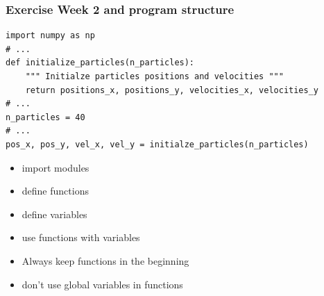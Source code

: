 \begin{frame}[fragile]

    \frametitle{Exercise Week 2 and program structure}

\begin{lstlisting}
import numpy as np
# ...
def initialize_particles(n_particles):
    """ Initialze particles positions and velocities """
    return positions_x, positions_y, velocities_x, velocities_y
# ...
n_particles = 40
# ...
pos_x, pos_y, vel_x, vel_y = initialze_particles(n_particles)

\end{lstlisting}

    \begin{itemize}
        \item import modules
        \item define functions
        \item define variables
        \item use functions with variables
    \end{itemize}

    \begin{itemize}
        \item Always keep functions in the beginning
        \item don't use global variables in functions
    \end{itemize}

\end{frame}








